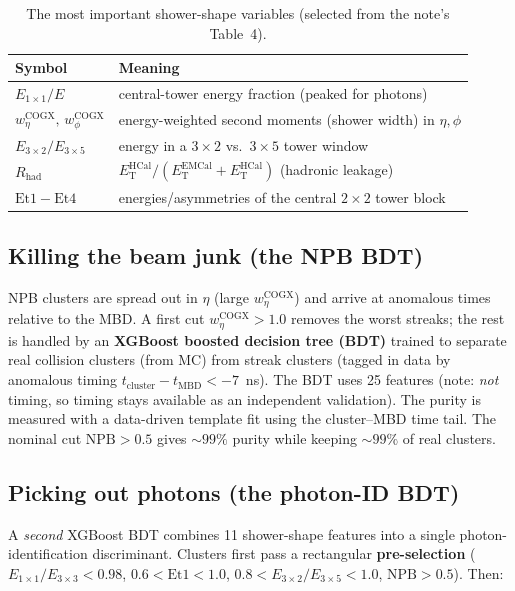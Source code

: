 \documentclass[11pt]{article}
\begin{document}
\begin{table}[h]
\centering
\caption{The most important shower-shape variables (selected from the note's Table~4).}
\begin{tabular}{ll}
\toprule
Symbol & Meaning \\
\midrule
$E_{1\times1}/E$ & central-tower energy fraction (peaked for photons) \\
$w_\eta^{\mathrm{COGX}},\,w_\phi^{\mathrm{COGX}}$ & energy-weighted second moments (shower width) in $\eta,\phi$ \\
$E_{3\times2}/E_{3\times5}$ & energy in a $3\times2$ vs.\ $3\times5$ tower window \\
$R_{\mathrm{had}}$ & $E_{\mathrm{T}}^{\mathrm{HCal}}/(E_{\mathrm{T}}^{\mathrm{EMCal}}+E_{\mathrm{T}}^{\mathrm{HCal}})$ (hadronic leakage) \\
$\mathrm{Et1}\!-\!\mathrm{Et4}$ & energies/asymmetries of the central $2\times2$ tower block \\
\bottomrule
\end{tabular}
\end{table}

\subsection{Killing the beam junk (the NPB BDT)}

NPB clusters are spread out in $\eta$ (large $w_\eta^{\mathrm{COGX}}$) and arrive at anomalous times
relative to the MBD. A first cut $w_\eta^{\mathrm{COGX}}>1.0$ removes the worst streaks; the rest is
handled by an \textbf{XGBoost boosted decision tree (BDT)} trained to separate real collision
clusters (from MC) from streak clusters (tagged in data by anomalous timing
$t_{\mathrm{cluster}}-t_{\mathrm{MBD}}<-7$~ns). The BDT uses 25 features (note: \emph{not} timing,
so timing stays available as an independent validation). The purity is measured with a data-driven
template fit using the cluster--MBD time tail. The nominal cut $\mathrm{NPB}>0.5$ gives
$\sim99\%$ purity while keeping $\sim99\%$ of real clusters.

\subsection{Picking out photons (the photon-ID BDT)}

A \emph{second} XGBoost BDT combines 11 shower-shape features into a single photon-identification
discriminant. Clusters first pass a rectangular \textbf{pre-selection}
($E_{1\times1}/E_{3\times3}<0.98$, $0.6<\mathrm{Et1}<1.0$, $0.8<E_{3\times2}/E_{3\times5}<1.0$,
$\mathrm{NPB}>0.5$). Then:
\end{document}
